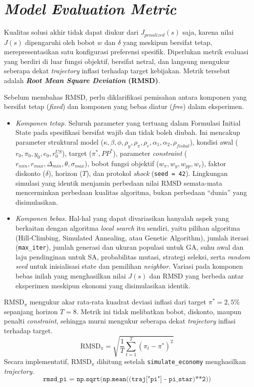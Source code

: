\section{\textit{Model Evaluation Metric}}

Kualitas solusi akhir tidak dapat diukur dari $J_{penalized}(s)$ saja, karena nilai $J(s)$ dipengaruhi oleh bobot $w$ dan $\delta$ yang meskipun bersifat tetap, merepresentasikan satu konfigurasi preferensi spesifik. Diperlukan metrik evaluasi yang berdiri di luar fungsi objektif, bersifat netral, dan langsung mengukur seberapa dekat \textit{trajectory} inflasi terhadap target kebijakan. Metrik tersebut adalah \textbf{\textit{Root Mean Square Deviation} (RMSD)}.

Sebelum membahas RMSD, perlu diklarifikasi pemisahan antara komponen yang bersifat tetap (\textit{fixed}) dan komponen yang bebas diatur (\textit{free}) dalam eksperimen.

\begin{itemize}
    \item \textit{Komponen tetap.} Seluruh parameter yang tertuang dalam Formulasi Initial State pada spesifikasi bersifat wajib dan tidak boleh diubah. Ini mencakup parameter struktural model ($\kappa, \beta, \phi, \rho_y, \rho_\pi, \rho_e, \alpha_1, \alpha_2, \rho_{fiskal}$), kondisi awal ($r_0, \pi_0, y_0, e_0, r_0^{US}$), target ($\pi^{*}, PP^{*}$), parameter \textit{constraint} ($r_{min}, r_{max}, \Delta_{min}, \theta, \sigma_{max}$), bobot fungsi objektif ($w_\pi, w_y, w_{pp}, w_r$), faktor diskonto ($\delta$), horizon ($T$), dan protokol \textit{shock} (\texttt{seed = 42}). Lingkungan simulasi yang identik menjamin perbedaan nilai RMSD semata-mata mencerminkan perbedaan kualitas algoritma, bukan perbedaan ``dunia'' yang disimulasikan.
    \item \textit{Komponen bebas.} Hal-hal yang dapat divariasikan hanyalah aspek yang berkaitan dengan algoritma \textit{local search} itu sendiri, yaitu pilihan algoritma (Hill-Climbing, Simulated Annealing, atau Genetic Algorithm), jumlah iterasi (\texttt{max\_iter}), jumlah generasi dan ukuran populasi untuk GA, suhu awal dan laju pendinginan untuk SA, probabilitas mutasi, strategi seleksi, serta \textit{random seed} untuk inisialisasi state dan pemilihan \textit{neighbor}. Variasi pada komponen bebas inilah yang menghasilkan nilai $J(s)$ dan RMSD yang berbeda antar eksperimen meskipun ekonomi yang disimulasikan identik.
\end{itemize}
RMSD$_{\pi}$ mengukur akar rata-rata kuadrat deviasi inflasi dari target $\pi^{*} = 2{,}5\%$ sepanjang horizon $T = 8$. Metrik ini tidak melibatkan bobot, diskonto, maupun penalti \textit{constraint}, sehingga murni mengukur seberapa dekat \textit{trajectory} inflasi terhadap target.
\[
    \text{RMSD}_{\pi} = \sqrt{\frac{1}{T} \sum_{t=1}^{T} (\pi_t - \pi^{*})^{2}}
\]
Secara implementatif, RMSD$_{\pi}$ dihitung setelah \texttt{simulate\_economy} menghasilkan \textit{trajectory}.
\[
    \texttt{rmsd\_pi = np.sqrt(np.mean((traj["pi"] - pi\_star)**2))}
\]

